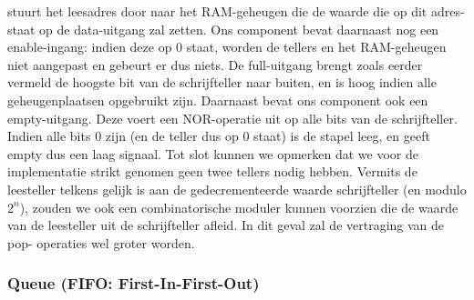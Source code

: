 stuurt het leesadres door naar het RAM-geheugen die de waarde die op dit adres-staat op de data-uitgang zal zetten. Ons component bevat daarnaast nog een enable-ingang: indien deze op 0 staat, worden de tellers en het RAM-geheugen niet aangepast en gebeurt er dus niets. De full-uitgang brengt zoals eerder vermeld de hoogste bit van de schrijfteller naar buiten, en is hoog indien alle geheugenplaatsen opgebruikt zijn. Daarnaast bevat ons component ook een empty-uitgang. Deze voert een NOR-operatie uit op alle bits van de schrijfteller. Indien alle bits 0 zijn (en de teller dus op 0 staat) is de stapel leeg, en geeft empty dus een laag signaal. Tot slot kunnen we opmerken dat we voor de implementatie strikt genomen geen twee tellers nodig hebben. Vermits de leesteller telkens gelijk is aan de gedecrementeerde waarde schrijfteller (en modulo $2^n$), zouden we ook een combinatorische moduler kunnen voorzien die de waarde van de leesteller uit de schrijfteller afleid. In dit geval zal de vertraging van de pop-
operaties wel groter worden.
\subsubsection{Queue (FIFO: First-In-First-Out)}
